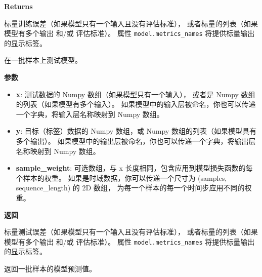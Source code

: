 \textbf{Returns}

标量训练误差（如果模型只有一个输入且没有评估标准），
或者标量的列表（如果模型有多个输出 和/或 评估标准）。 属性
\texttt{model.metrics\_names} 将提供标量输出的显示标签。



\label{testux5fonux5fbatch}

\begin{Shaded}
\begin{Highlighting}[]
\OperatorTok{=}\NormalTok{)}
\end{Highlighting}
\end{Shaded}

在一批样本上测试模型。

\textbf{参数}

\begin{itemize}
\tightlist
\item
  \textbf{x}: 测试数据的 Numpy 数组（如果模型只有一个输入）， 或者是
  Numpy 数组的列表（如果模型有多个输入）。
  如果模型中的输入层被命名，你也可以传递一个字典，将输入层名称映射到
  Numpy 数组。
\item
  \textbf{y}: 目标（标签）数据的 Numpy 数组，或 Numpy
  数组的列表（如果模型具有多个输出）。
  如果模型中的输出层被命名，你也可以传递一个字典，将输出层名称映射到
  Numpy 数组。
\item
  \textbf{sample\_weight}: 可选数组，与 x
  长度相同，包含应用到模型损失函数的每个样本的权重。
  如果是时域数据，你可以传递一个尺寸为 (samples, sequence\_length) 的 2D
  数组， 为每一个样本的每一个时间步应用不同的权重。
\end{itemize}

\textbf{返回}

标量测试误差（如果模型只有一个输入且没有评估标准），
或者标量的列表（如果模型有多个输出 和/或 评估标准）。 属性
\texttt{model.metrics\_names} 将提供标量输出的显示标签。



\label{predictux5fonux5fbatch}

\begin{Shaded}
\begin{Highlighting}[]
\end{Highlighting}
\end{Shaded}

返回一批样本的模型预测值。

